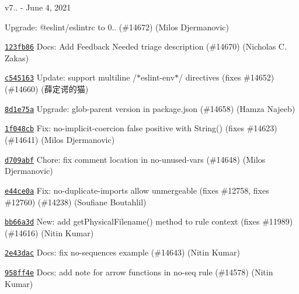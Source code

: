 v7.. -\/ June 4, 2021


\begin{DoxyItemize}
\item \href{https://github.com/eslint/eslint/commit/1237705dd08c209c5e3136045ec51a4ba87a3abe}{\texttt{ {}}} Upgrade\+: @eslint/eslintrc to 0.. (\#14672) (Milos Djermanovic)
\item \href{https://github.com/eslint/eslint/commit/123fb8648731c2c23313c544ffa1872d3024fe68}{\texttt{ {\ttfamily 123fb86}}} Docs\+: Add Feedback Needed triage description (\#14670) (Nicholas C. Zakas)
\item \href{https://github.com/eslint/eslint/commit/c5451635b4e89827cfc8d8d77083647c74506e42}{\texttt{ {\ttfamily c545163}}} Update\+: support multiline /\texorpdfstring{$\ast$}{*}eslint-\/env\texorpdfstring{$\ast$}{*}/ directives (fixes \#14652) (\#14660) (薛定谔的猫)
\item \href{https://github.com/eslint/eslint/commit/8d1e75a31b3e3d67130709a219bdd07ce6f3cf74}{\texttt{ {\ttfamily 8d1e75a}}} Upgrade\+: glob-\/parent version in package.\+json (\#14658) (Hamza Najeeb)
\item \href{https://github.com/eslint/eslint/commit/1f048cb0eec660d2052f1758f4b2ad7b1cb424e1}{\texttt{ {\ttfamily 1f048cb}}} Fix\+: no-\/implicit-\/coercion false positive with {\ttfamily String()} (fixes \#14623) (\#14641) (Milos Djermanovic)
\item \href{https://github.com/eslint/eslint/commit/d709abfdde087325d4578b6709dc61040b8ca9d8}{\texttt{ {\ttfamily d709abf}}} Chore\+: fix comment location in no-\/unused-\/vars (\#14648) (Milos Djermanovic)
\item \href{https://github.com/eslint/eslint/commit/e44ce0a8acfaad513c385150c25e76e82a1b8f12}{\texttt{ {\ttfamily e44ce0a}}} Fix\+: no-\/duplicate-\/imports allow unmergeable (fixes \#12758, fixes \#12760) (\#14238) (Soufiane Boutahlil)
\item \href{https://github.com/eslint/eslint/commit/bb66a3d91af426dac9a7ffdbe47bdbbc0ffd4dd7}{\texttt{ {\ttfamily bb66a3d}}} New\+: add {\ttfamily get\+Physical\+Filename()} method to rule context (fixes \#11989) (\#14616) (Nitin Kumar)
\item \href{https://github.com/eslint/eslint/commit/2e43dacd24337a82d4184fac9b44d497675f46ef}{\texttt{ {\ttfamily 2e43dac}}} Docs\+: fix {\ttfamily no-\/sequences} example (\#14643) (Nitin Kumar)
\item \href{https://github.com/eslint/eslint/commit/958ff4e8a5102f204f1484d09985e28a79790996}{\texttt{ {\ttfamily 958ff4e}}} Docs\+: add note for arrow functions in no-\/seq rule (\#14578) (Nitin Kumar)

\end{DoxyItemize}
